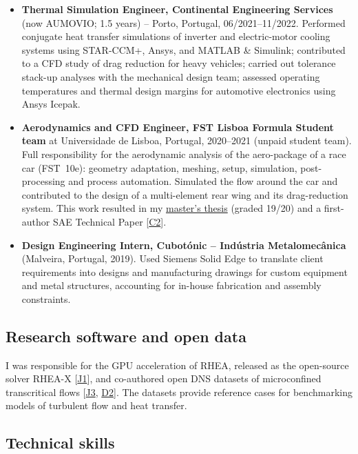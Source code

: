 \documentclass[11pt]{article}
\newcommand{\NEW}[1]{\iffinal #1\else{\color{red}#1}\fi} %
\begin{document}
\begin{itemize}[itemsep=3pt]
	\item \textbf{Thermal Simulation Engineer, Continental Engineering Services} (now AUMOVIO; 1.5 years) -- Porto, Portugal, 06/2021--11/2022. Performed conjugate heat transfer simulations of inverter and electric-motor cooling systems using STAR-CCM+, Ansys, and \NEW{MATLAB} \& Simulink; contributed to a CFD study of drag reduction for heavy vehicles; carried out tolerance stack-up analyses with the mechanical design team;
	assessed operating temperatures and thermal design margins for automotive electronics using Ansys Icepak. 
	
	\item \textbf{Aerodynamics and CFD Engineer, FST Lisboa Formula Student team} at Universidade de Lisboa, Portugal, 2020--2021 (unpaid student team). Full responsibility for the \NEW{aerodynamic} analysis of the aero-package of a \NEW{race car} (FST~10e): geometry adaptation, meshing, setup, simulation, post-processing and process automation. Simulated the flow around the car and contributed to the design of a multi-element rear wing and its	drag-reduction system. This work resulted in my \href{http://hdl.handle.net/10362/149236}{master's thesis} (graded 19/20) and a first-author SAE Technical Paper [\hyperlink{pub-C2}{C2}].\nocert
	
	\item \textbf{Design Engineering Intern, Cubot\'onic -- Ind\'ustria Metalomec\^anica}
	(Malveira, Portugal, 2019).
	Used Siemens Solid Edge to translate client requirements into designs and manufacturing drawings for custom equipment and metal structures, accounting for in-house fabrication and assembly constraints.\nocert
\end{itemize}

\subsection{Research software and open data}

I was responsible for the GPU acceleration of RHEA, released as the open-source solver RHEA-X [\hyperlink{pub-J1}{J1}], and co-authored open DNS datasets of microconfined transcritical flows [\hyperlink{pub-J3}{J3}, \hyperlink{pub-D2}{D2}]. The datasets provide reference cases for benchmarking models of turbulent flow and heat transfer.

\subsection{Technical skills}
\end{document}
